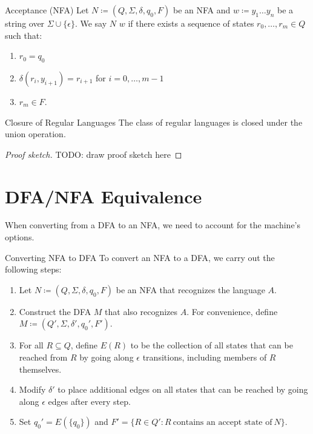 \documentclass[12pt]{report}
\begin{document}
\begin{dfnbox}{Acceptance (NFA)}{}
    Let $N \coloneq (Q, \Sigma, \delta, q_0, F)$ be an NFA and $w \coloneq y_1 \ldots y_n$ be a string over $\Sigma \cup \{\epsilon\}$. We say $N$  $w$ if there exists a sequence of states $r_0, \ldots, r_m \in Q$ such that:
    \begin{enumerate}[noitemsep]
        \item $r_0 = q_0$
        \item $\delta(r_i, y_{i+1}) = r_{i+1}$ for $i = 0, \ldots, m-1$
        \item $r_m \in F$.
    \end{enumerate}
\end{dfnbox}

\begin{thmbox}{Closure of Regular Languages}{}
    The class of regular languages is closed under the union operation.
    \tcblower
    \begin{proof}[Proof sketch]
        TODO: draw proof sketch here
    \end{proof}
\end{thmbox}

\section{DFA/NFA Equivalence}

When converting from a DFA to an NFA, we need to account for the machine's options.

\begin{tecbox}{Converting NFA to DFA}{}
    To convert an NFA to a DFA, we carry out the following steps:
    \begin{enumerate}
        \item Let $N \coloneq (Q, \Sigma, \delta, q_0, F)$ be an NFA that recognizes the language $A$.
        \item Construct the DFA $M$ that also recognizes $A$. For convenience, define $M \coloneq (Q\prime, \Sigma, \delta\prime, q_0\prime, F\prime)$.
        \item For all $R \subseteq Q$, define $E(R)$ to be the collection of all states that can be reached from $R$ by going along $\epsilon$ transitions, including members of $R$ themselves.
        \item Modify $\delta\prime$ to place additional edges on all states that can be reached by going along $\epsilon$ edges after every step.
        \item Set $q_0\prime = E(\{q_0\})$ and $F\prime = \{ R \in Q\prime : R\ \text{contains an accept state of}\ N \}$.
    \end{enumerate}
\end{tecbox}

\amzindex
\end{document}
